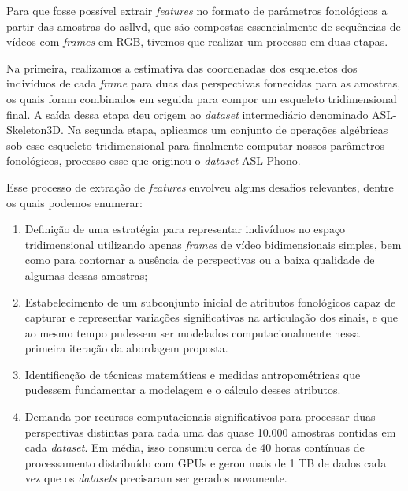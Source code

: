Para que fosse possível extrair \textit{features} no formato de parâmetros fonológicos a partir das amostras do \acrshort{asllvd}, que são compostas essencialmente de sequências de vídeos com \textit{frames} em RGB, tivemos que realizar um processo em duas etapas.

Na primeira, realizamos a estimativa das coordenadas dos esqueletos dos indivíduos de cada \textit{frame} para duas das perspectivas fornecidas para as amostras, os quais foram combinados em seguida para compor um esqueleto tridimensional final. A saída dessa etapa deu origem ao \textit{dataset} intermediário denominado ASL-Skeleton3D.
Na segunda etapa, aplicamos um conjunto de operações algébricas sob esse esqueleto tridimensional para finalmente computar nossos parâmetros fonológicos, processo esse que originou o \textit{dataset} ASL-Phono.


Esse processo de extração de \textit{features} envolveu alguns desafios relevantes, dentre os quais podemos enumerar:

\begin{enumerate}
    \item Definição de uma estratégia para representar indivíduos no espaço tridimensional utilizando apenas \textit{frames} de vídeo bidimensionais simples, bem como para contornar a ausência de perspectivas ou a baixa qualidade de algumas dessas amostras;

    \item Estabelecimento de um subconjunto inicial de atributos fonológicos capaz de capturar e representar variações significativas na articulação dos sinais, e que ao mesmo tempo pudessem ser modelados computacionalmente nessa primeira iteração da abordagem proposta.

    \item Identificação de técnicas matemáticas e medidas antropométricas que pudessem fundamentar a modelagem e o cálculo desses atributos.

    \item Demanda por recursos computacionais significativos para processar duas perspectivas distintas para cada uma das quase 10.000 amostras contidas em cada \textit{dataset}. Em média, isso consumiu cerca de 40 horas contínuas de processamento distribuído com GPUs e gerou mais de 1 TB de dados cada vez que os \textit{datasets} precisaram ser gerados novamente.
\end{enumerate}





